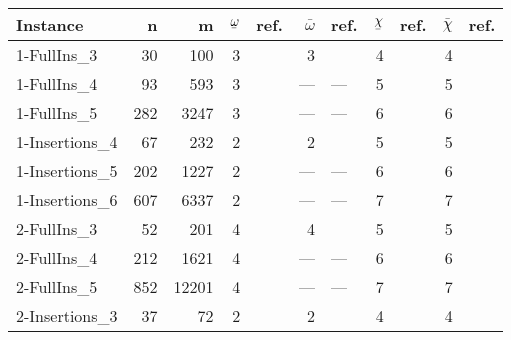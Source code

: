 \begingroup\footnotesize
\begin{longtable}{lrrrlrlrlrl}
  \toprule
  Instance & n & m & $\ubar{\omega}$ & ref. & $\bar{\omega}$ & ref. & $\ubar{\chi}$ & ref. & $\bar{\chi}$ & ref. \\ \midrule
1-FullIns\_3 & 30 & 100 & 3 & \cite{Gualandi2012} & 3 & \cite{Gualandi2012} & 4 & \cite{Gualandi2012} & 4 & \cite{Gualandi2012} \\ 
  1-FullIns\_4 & 93 & 593 & 3 & \cite{Malaguti2011} & --- & --- & 5 & \cite{Mendez-Diaz2006} & 5 & \cite{Mendez-Diaz2006,Malaguti2011,Gualandi2012,Brelaz1979,Sewell1996,Segundo2012} \\ 
  1-FullIns\_5 & 282 & 3247 & 3 & \cite{Malaguti2011} & --- & --- & 6 & \cite{Malaguti2010} & 6 & \cite{Malaguti2010,Mendez-Diaz2006,Malaguti2011,Gualandi2012,Brelaz1979,Sewell1996,Segundo2012} \\ 
  1-Insertions\_4 & 67 & 232 & 2 & \cite{Malaguti2011,Gualandi2012} & 2 & \cite{Gualandi2012} & 5 & \cite{Mendez-Diaz2006,Malaguti2011,Gualandi2012} & 5 & \cite{Mendez-Diaz2006,Malaguti2011,Gualandi2012,Brelaz1979,Sewell1996,Segundo2012} \\ 
  1-Insertions\_5 & 202 & 1227 & 2 & \cite{Malaguti2011} & --- & --- & 6 & \cite{Malaguti2010} & 6 & \cite{Mendez-Diaz2006,Malaguti2011,Gualandi2012,Brelaz1979,Sewell1996,Segundo2012} \\ 
  1-Insertions\_6 & 607 & 6337 & 2 & \cite{Malaguti2011,Held2011} & --- & --- & 7 & \cite{Malaguti2010} & 7 & \cite{Mendez-Diaz2006,Malaguti2011,Gualandi2012} \\ 
  2-FullIns\_3 & 52 & 201 & 4 & \cite{Malaguti2011,Gualandi2012} & 4 & \cite{Gualandi2012} & 5 & \cite{Mendez-Diaz2006,Malaguti2011,Gualandi2012} & 5 & \cite{Mendez-Diaz2006,Malaguti2011,Gualandi2012,Brelaz1979,Sewell1996,Segundo2012} \\ 
  2-FullIns\_4 & 212 & 1621 & 4 & \cite{us} & --- & --- & 6 & \cite{Malaguti2010} & 6 & \cite{Malaguti2010,Mendez-Diaz2006,Malaguti2011,Gualandi2012,Brelaz1979,Sewell1996,Segundo2012} \\ 
  2-FullIns\_5 & 852 & 12201 & 4 & \cite{us} & --- & --- & 7 & \cite{Malaguti2010,Mendez-Diaz2006} & 7 & \cite{Malaguti2010,Mendez-Diaz2006,Gualandi2012,Brelaz1979,Sewell1996,Segundo2012} \\ 
  2-Insertions\_3 & 37 & 72 & 2 & \cite{Malaguti2011} & 2 & \cite{Gualandi2012} & 4 & \cite{Caramia,Gualandi2012} & 4 & \cite{Caramia,Gualandi2012} \\ 

\end{longtable}
